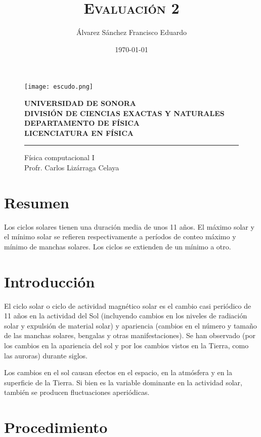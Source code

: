 
\author{Álvarez Sánchez Francisco Eduardo}
\title{\textbf{\textsc{Evaluación 2}}} 
\date{\today}



\begin{titlepage}
	\centering
    \begin{figure}[ht!]
    \centering
    \texttt{[image: escudo.png]}
    
    \textbf{UNIVERSIDAD DE SONORA \\ DIVISIÓN DE CIENCIAS EXACTAS Y NATURALES \\ DEPARTAMENTO DE FÍSICA \\ LICENCIATURA EN FÍSICA}
	\maketitle
    \hrule \bigskip
    \large{Física computacional I}\\
	Profr. Carlos Lizárraga Celaya
    \end{figure}
\thispagestyle{empty}
\end{titlepage}

\newpage
\section{Resumen}
\noindent  Los ciclos solares tienen una duración media de unos 11 años. El máximo solar y el mínimo solar se refieren respectivamente a períodos de conteo máximo y mínimo de manchas solares. Los ciclos se extienden de un mínimo a otro.
\section{Introducción}
\noindent El ciclo solar o ciclo de actividad magnético solar es el cambio casi periódico de 11 años en la actividad del Sol (incluyendo cambios en los niveles de radiación solar y expulsión de material solar) y apariencia (cambios en el número y tamaño de las manchas solares, bengalas y otras manifestaciones). Se han observado (por los cambios en la apariencia del sol y por los cambios vistos en la Tierra, como las auroras) durante siglos.

Los cambios en el sol causan efectos en el espacio, en la atmósfera y en la superficie de la Tierra. Si bien es la variable dominante en la actividad solar, también se producen fluctuaciones aperiódicas.
\newpage
\section{Procedimiento}
